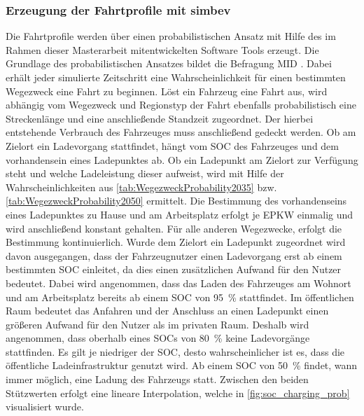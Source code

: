 \subsubsection{Erzeugung der Fahrtprofile mit simbev}


Die Fahrtprofile werden über einen pro­ba­bi­lis­tischen Ansatz mit Hilfe des im Rahmen dieser Masterarbeit mitentwickelten Software Tools \simbev erzeugt.
Die Grundlage des pro­ba­bi­lis­tischen Ansatzes bildet die Befragung \gls{MID} \cite{ISGH2017}.
Dabei erhält jeder simulierte Zeitschritt eine Wahrscheinlichkeit für einen bestimmten Wegezweck eine Fahrt zu beginnen.
Löst ein Fahrzeug eine Fahrt aus, wird abhängig vom Wegezweck und Regionstyp der Fahrt ebenfalls pro­ba­bi­lis­tisch eine Streckenlänge und eine anschließende Standzeit zugeordnet.
Der hierbei entstehende Verbrauch des Fahrzeuges muss anschließend gedeckt werden.
Ob am Zielort ein Ladevorgang stattfindet, hängt vom \gls{SOC} des Fahrzeuges und dem vorhandensein eines Ladepunktes ab.
Ob ein Ladepunkt am Zielort zur Verfügung steht und welche Ladeleistung dieser aufweist, wird mit Hilfe der Wahrscheinlichkeiten aus \autoref{tab:WegezweckProbability2035} bzw. \autoref{tab:WegezweckProbability2050} ermittelt.
Die Bestimmung des vorhandenseins eines Ladepunktes zu Hause und am Arbeitsplatz erfolgt je \gls{EPKW} einmalig und wird anschließend konstant gehalten.
Für alle anderen Wegezwecke, erfolgt die Bestimmung kontinuierlich.
Wurde dem Zielort ein Ladepunkt zugeordnet wird davon ausgegangen, dass der Fahrzeugnutzer einen Ladevorgang erst ab einem bestimmten \gls{SOC} einleitet, da dies einen zusätzlichen Aufwand für den Nutzer bedeutet.
Dabei wird angenommen, dass das Laden des Fahrzeuges am Wohnort und am Arbeitsplatz bereits ab einem \gls{SOC} von \SI{95}{\percent} stattfindet.
Im öffentlichen Raum bedeutet das Anfahren und der Anschluss an einen Ladepunkt einen größeren Aufwand für den Nutzer als im privaten Raum.
Deshalb wird angenommen, dass oberhalb eines \glspl{SOC} von \SI{80}{\percent} keine Ladevorgänge stattfinden.
Es gilt je niedriger der \gls{SOC}, desto wahrscheinlicher ist es, dass die öffentliche Ladeinfrastruktur genutzt wird.
Ab einem \gls{SOC} von \SI{50}{\percent} findet, wann immer möglich, eine Ladung des Fahrzeugs statt.
Zwischen den beiden Stützwerten erfolgt eine lineare Interpolation, welche in \autoref{fig:soc_charging_prob} visualisiert wurde.

